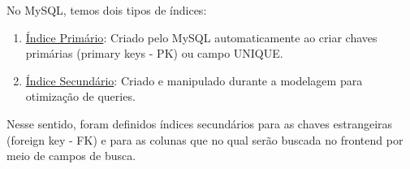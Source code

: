 No MySQL, temos dois tipos de índices:

\begin{enumerate}
	\item \underline{Índice Primário}: Criado pelo MySQL automaticamente ao criar chaves primárias (primary keys - PK) ou campo UNIQUE.
	\item \underline{Índice Secundário}: Criado e manipulado durante a modelagem para otimização de queries.
\end{enumerate}	

Nesse sentido, foram definidos índices secundários para as chaves estrangeiras (foreign key - FK) e para as colunas que no qual serão buscada no frontend por meio de campos de busca.

